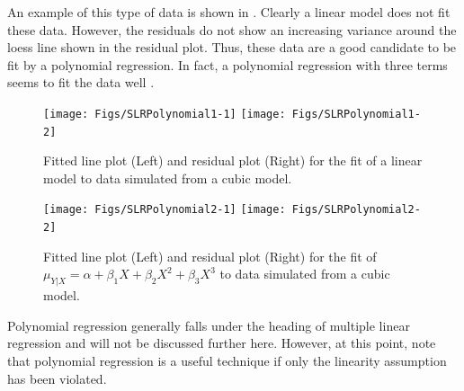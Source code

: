 \documentclass[10pt,openany]{book}\usepackage[]{graphicx}\usepackage[]{color}
\newenvironment{knitrout}{}{} %
\begin{document}
An example of this type of data is shown in .  Clearly a linear model does not fit these data.  However, the residuals do not show an increasing variance around the loess line shown in the residual plot.  Thus, these data are a good candidate to be fit by a polynomial regression.  In fact, a polynomial regression with three terms seems to fit the data well .

\begin{knitrout}
\color{fgcolor}\begin{figure}[h]

{\centering \texttt{[image: Figs/SLRPolynomial1-1]} 
\texttt{[image: Figs/SLRPolynomial1-2]} 

}

\caption[Fitted line plot (Left) and residual plot (Right) for the fit of a linear model to data simulated from a cubic model]{Fitted line plot (Left) and residual plot (Right) for the fit of a linear model to data simulated from a cubic model.}\label{fig:SLRPolynomial1}
\end{figure}


\end{knitrout}

\begin{knitrout}
\color{fgcolor}\begin{figure}[h]

{\centering \texttt{[image: Figs/SLRPolynomial2-1]} 
\texttt{[image: Figs/SLRPolynomial2-2]} 

}

\caption[Fitted line plot (Left) and residual plot (Right) for the fit of ]{Fitted line plot (Left) and residual plot (Right) for the fit of $\mu_{Y|X}=\alpha+\beta_{1}X+\beta_{2}X^{2}+\beta_{3}X^{3}$ to data simulated from a cubic model.}\label{fig:SLRPolynomial2}
\end{figure}


\end{knitrout}

Polynomial regression generally falls under the heading of multiple linear regression and will not be discussed further here.  However, at this point, note that polynomial regression is a useful technique if only the linearity assumption has been violated.

\end{document}
